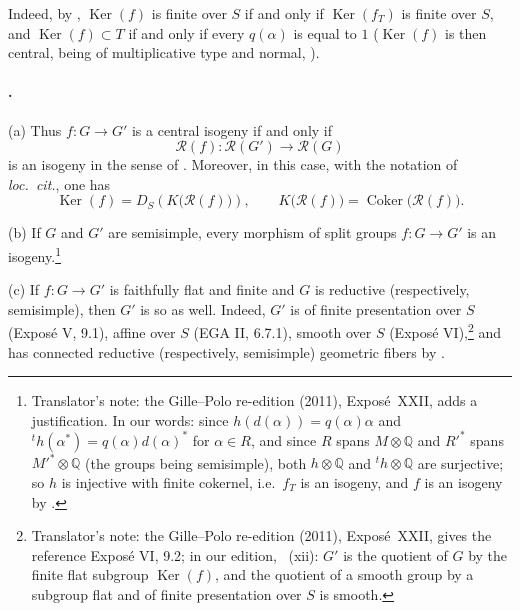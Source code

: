 Indeed, by , \(\operatorname{Ker}(f)\) is finite over \(S\)
if and only if \(\operatorname{Ker}(f_T)\) is finite over \(S\),
and \(\operatorname{Ker}(f)\subset T\) if and only if every
\(q(\alpha)\) is equal to \(1\) \textup{(\(\operatorname{Ker}(f)\) is then
central, being of multiplicative type and normal, )}.

\paragraph{.}
\textup{(a)} Thus \(f:G\to G'\) is a central isogeny if and only if
\[
  \mathscr R(f):\mathscr R(G')\longrightarrow\mathscr R(G)
\]
is an isogeny in the sense of . Moreover, in this
case, with the notation of \emph{loc.\ cit.}, one has
\[
  \operatorname{Ker}(f)
  =
  D_S\!\left(K\bigl(\mathscr R(f)\bigr)\right),
  \qquad
  K\bigl(\mathscr R(f)\bigr)
  =
  \operatorname{Coker}\bigl(\mathscr R(f)\bigr).
\]

\textup{(b)} If \(G\) and \(G'\) are semisimple, every morphism of
split groups \(f:G\to G'\) is an isogeny.\footnote{Translator's note: the Gille--Polo re-edition (2011), Exposé~XXII, adds a
justification. In our words: since \(h(d(\alpha))=q(\alpha)\alpha\) and
\({}^th(\alpha^*)=q(\alpha)d(\alpha)^*\) for \(\alpha\in R\), and since \(R\)
spans \(M\otimes\mathbb Q\) and \(R'^*\) spans \(M'^*\otimes\mathbb Q\) (the
groups being semisimple), both \(h\otimes\mathbb Q\) and
\({}^th\otimes\mathbb Q\) are surjective; so \(h\) is injective with finite
cokernel, i.e.\ \(f_T\) is an isogeny, and \(f\) is an isogeny by
.}

\textup{(c)} If \(f:G\to G'\) is faithfully flat and finite and
\(G\) is reductive \textup{(respectively, semisimple)}, then \(G'\)
is so as well. Indeed, \(G'\) is of finite presentation over \(S\)
\textup{(Exposé V, 9.1)}, affine over \(S\)
\textup{(EGA II, 6.7.1)}, smooth over \(S\)
\textup{(Exposé VI)},\footnote{Translator's note: the Gille--Polo re-edition (2011), Exposé~XXII, gives the
reference Exposé VI, 9.2; in our edition, ~(xii): \(G'\)
is the quotient of \(G\) by the finite flat subgroup \(\operatorname{Ker}(f)\),
and the quotient of a smooth group by a subgroup flat and of finite
presentation over \(S\) is smooth.} and has connected reductive
\textup{(respectively, semisimple)} geometric fibers by .

